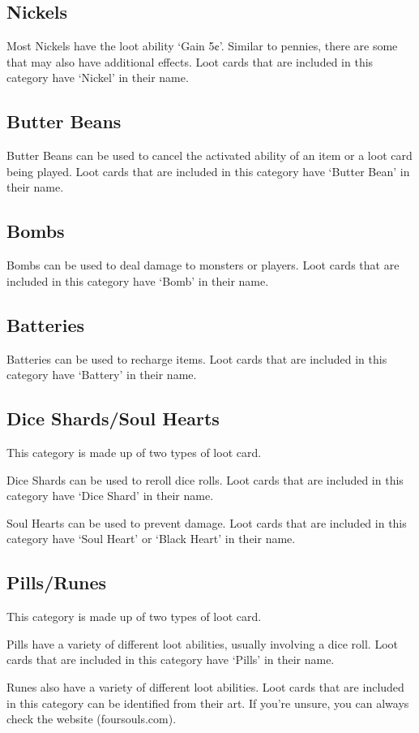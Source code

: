 \documentclass[a4paper, twoside]{report} %
\begin{document}
    \subsection*{Nickels}
    Most Nickels have the loot ability ‘Gain 5¢’. Similar to pennies, there are some that may also have additional effects. Loot cards that are included in this category have ‘Nickel’ in their name.
    \subsection*{Butter Beans}
    Butter Beans can be used to cancel the activated ability of an item or a loot card being played. Loot cards that are included in this category have ‘Butter Bean’ in their name.
    \subsection*{Bombs}
    Bombs can be used to deal damage to monsters or players. Loot cards that are included in this category have ‘Bomb’ in their name.
    \subsection*{Batteries}
    Batteries can be used to recharge items. Loot cards that are included in this category have ‘Battery’ in their name.
    \subsection*{Dice Shards/Soul Hearts}
    This category is made up of two types of loot card.
    
    Dice Shards can be used to reroll dice rolls. Loot cards that are included in this category have ‘Dice Shard’ in their name.
    
    Soul Hearts can be used to prevent damage. Loot cards that are included in this category have ‘Soul Heart’ or ‘Black Heart’ in their name.
    \subsection*{Pills/Runes}
    This category is made up of two types of loot card.
    
    Pills have a variety of different loot abilities, usually involving a dice roll. Loot cards that are included in this category have ‘Pills’ in their name.
    
    Runes also have a variety of different loot abilities. Loot cards that are included in this category can be identified from their art. If you’re unsure, you can always check the website (foursouls.com).
\end{document}
